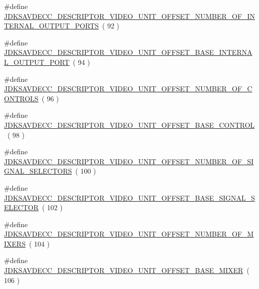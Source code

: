 \begin{DoxyCompactItemize}
\item 
\#define \hyperlink{group__descriptor__video_ga4e6712999a691ac04002727017fa468a}{J\+D\+K\+S\+A\+V\+D\+E\+C\+C\+\_\+\+D\+E\+S\+C\+R\+I\+P\+T\+O\+R\+\_\+\+V\+I\+D\+E\+O\+\_\+\+U\+N\+I\+T\+\_\+\+O\+F\+F\+S\+E\+T\+\_\+\+N\+U\+M\+B\+E\+R\+\_\+\+O\+F\+\_\+\+I\+N\+T\+E\+R\+N\+A\+L\+\_\+\+O\+U\+T\+P\+U\+T\+\_\+\+P\+O\+R\+TS}~( 92 )
\item 
\#define \hyperlink{group__descriptor__video_gad22f83f611bfb86d2a69fa01948b3778}{J\+D\+K\+S\+A\+V\+D\+E\+C\+C\+\_\+\+D\+E\+S\+C\+R\+I\+P\+T\+O\+R\+\_\+\+V\+I\+D\+E\+O\+\_\+\+U\+N\+I\+T\+\_\+\+O\+F\+F\+S\+E\+T\+\_\+\+B\+A\+S\+E\+\_\+\+I\+N\+T\+E\+R\+N\+A\+L\+\_\+\+O\+U\+T\+P\+U\+T\+\_\+\+P\+O\+RT}~( 94 )
\item 
\#define \hyperlink{group__descriptor__video_ga25671c1f2b8830605f44100ecc494efd}{J\+D\+K\+S\+A\+V\+D\+E\+C\+C\+\_\+\+D\+E\+S\+C\+R\+I\+P\+T\+O\+R\+\_\+\+V\+I\+D\+E\+O\+\_\+\+U\+N\+I\+T\+\_\+\+O\+F\+F\+S\+E\+T\+\_\+\+N\+U\+M\+B\+E\+R\+\_\+\+O\+F\+\_\+\+C\+O\+N\+T\+R\+O\+LS}~( 96 )
\item 
\#define \hyperlink{group__descriptor__video_ga772a9bc330db0f09c0da5cb0f7f168ef}{J\+D\+K\+S\+A\+V\+D\+E\+C\+C\+\_\+\+D\+E\+S\+C\+R\+I\+P\+T\+O\+R\+\_\+\+V\+I\+D\+E\+O\+\_\+\+U\+N\+I\+T\+\_\+\+O\+F\+F\+S\+E\+T\+\_\+\+B\+A\+S\+E\+\_\+\+C\+O\+N\+T\+R\+OL}~( 98 )
\item 
\#define \hyperlink{group__descriptor__video_gaabd0b26c17ac1e40df56d0cb57abf679}{J\+D\+K\+S\+A\+V\+D\+E\+C\+C\+\_\+\+D\+E\+S\+C\+R\+I\+P\+T\+O\+R\+\_\+\+V\+I\+D\+E\+O\+\_\+\+U\+N\+I\+T\+\_\+\+O\+F\+F\+S\+E\+T\+\_\+\+N\+U\+M\+B\+E\+R\+\_\+\+O\+F\+\_\+\+S\+I\+G\+N\+A\+L\+\_\+\+S\+E\+L\+E\+C\+T\+O\+RS}~( 100 )
\item 
\#define \hyperlink{group__descriptor__video_ga4b387d079f7f1d15f21c6d3047ee4723}{J\+D\+K\+S\+A\+V\+D\+E\+C\+C\+\_\+\+D\+E\+S\+C\+R\+I\+P\+T\+O\+R\+\_\+\+V\+I\+D\+E\+O\+\_\+\+U\+N\+I\+T\+\_\+\+O\+F\+F\+S\+E\+T\+\_\+\+B\+A\+S\+E\+\_\+\+S\+I\+G\+N\+A\+L\+\_\+\+S\+E\+L\+E\+C\+T\+OR}~( 102 )
\item 
\#define \hyperlink{group__descriptor__video_ga7a82128169e8a55c843eecd28f8fbab2}{J\+D\+K\+S\+A\+V\+D\+E\+C\+C\+\_\+\+D\+E\+S\+C\+R\+I\+P\+T\+O\+R\+\_\+\+V\+I\+D\+E\+O\+\_\+\+U\+N\+I\+T\+\_\+\+O\+F\+F\+S\+E\+T\+\_\+\+N\+U\+M\+B\+E\+R\+\_\+\+O\+F\+\_\+\+M\+I\+X\+E\+RS}~( 104 )
\item 
\#define \hyperlink{group__descriptor__video_ga446fcd5e0f0758b64612889b09b8f486}{J\+D\+K\+S\+A\+V\+D\+E\+C\+C\+\_\+\+D\+E\+S\+C\+R\+I\+P\+T\+O\+R\+\_\+\+V\+I\+D\+E\+O\+\_\+\+U\+N\+I\+T\+\_\+\+O\+F\+F\+S\+E\+T\+\_\+\+B\+A\+S\+E\+\_\+\+M\+I\+X\+ER}~( 106 )

\end{DoxyCompactItemize}
